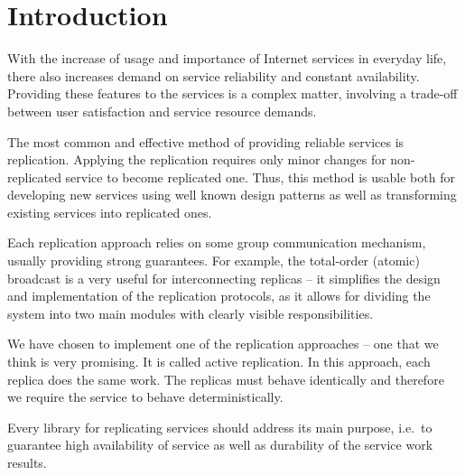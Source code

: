 \chapter{Introduction}

With the increase of usage and importance of Internet services in everyday life, there also increases demand on service reliability and constant availability.
Providing these features to the services is a complex matter, involving a trade-off between user satisfaction and service resource demands.

The most common and effective method of providing reliable services is replication. Applying the replication requires only minor changes for non-replicated service to become replicated one. Thus, this method is usable both for developing new services using well known design patterns as well as transforming existing services into replicated ones.

Each replication approach relies on some group communication mechanism, usually providing strong guarantees. For example, the total-order (atomic) broadcast is a very useful for interconnecting replicas -- it simplifies the design and implementation of the replication protocols, as it allows for dividing the system into two main modules with clearly visible responsibilities.

We have chosen to implement one of the replication approaches -- one that we think is very promising.
It is called active replication. In this approach, each replica does the same work. The replicas must behave identically and therefore we require the service to behave deterministically.

Every library for replicating services should address its main purpose, i.e.\ to guarantee high availability of service as well as durability of the service work results.


